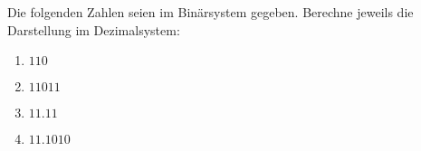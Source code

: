 \begin{exercise}
  Die folgenden Zahlen seien im Binärsystem gegeben. Berechne jeweils die
  Darstellung im Dezimalsystem:
  \begin{enumerate}
  \item $110$
  \item $11011$
  \item $11.11$
  \item $11.1010$
  \end{enumerate}
\end{exercise}
